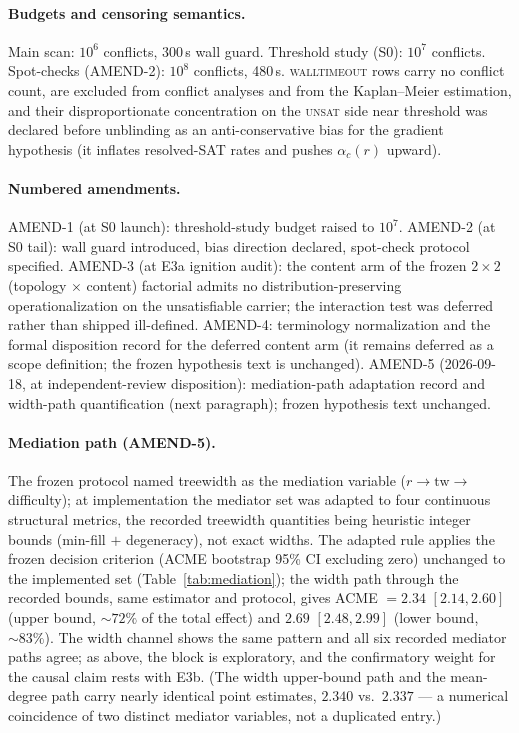 \documentclass[manuscript, screen, review]{jair}
\newcommand{\ac}[1]{\ensuremath{\alpha_c(#1)}}
\begin{document}
\paragraph{Budgets and censoring semantics.}
Main scan: $10^6$ conflicts, 300\,s wall guard. Threshold study (S0):
$10^7$ conflicts. Spot-checks (AMEND-2): $10^8$ conflicts, 480\,s.
\textsc{walltimeout} rows carry no conflict count, are excluded from
conflict analyses and from the Kaplan--Meier estimation, and their
disproportionate concentration on the \textsc{unsat} side near threshold was
declared before unblinding as an anti-conservative bias for the gradient
hypothesis (it inflates resolved-SAT rates and pushes $\ac{r}$ upward).

\paragraph{Numbered amendments.}
AMEND-1 (at S0 launch): threshold-study budget raised to $10^7$.
AMEND-2 (at S0 tail): wall guard introduced, bias direction declared,
spot-check protocol specified. AMEND-3 (at E3a ignition audit): the content
arm of the frozen $2\times2$ (topology $\times$ content) factorial admits no
distribution-preserving operationalization on the unsatisfiable carrier; the
interaction test was deferred rather than shipped ill-defined. AMEND-4:
terminology normalization and the formal disposition record for the deferred
content arm (it remains deferred as a scope definition; the frozen hypothesis
text is unchanged). AMEND-5 (2026-09-18, at independent-review disposition):
mediation-path adaptation record and width-path quantification (next
paragraph); frozen hypothesis text unchanged.

\paragraph{Mediation path (AMEND-5).}
The frozen protocol named treewidth as the mediation variable
($r \to \mathrm{tw} \to$ difficulty); at implementation the mediator set was
adapted to four continuous structural metrics, the recorded treewidth
quantities being heuristic integer bounds (min-fill $+$ degeneracy), not
exact widths. The adapted rule applies the frozen decision criterion (ACME
bootstrap 95\% CI excluding zero) unchanged to the implemented set
(Table~\ref{tab:mediation}); the width path through the recorded bounds,
same estimator and protocol, gives ACME $= 2.34$ $[2.14, 2.60]$ (upper
bound, ${\sim}72\%$ of the total effect) and $2.69$ $[2.48, 2.99]$ (lower
bound, ${\sim}83\%$). The width channel shows the same pattern and all six
recorded mediator paths agree; as above, the block is exploratory, and the
confirmatory weight for the causal claim rests with E3b. (The width
upper-bound path and the mean-degree path carry nearly identical point
estimates, $2.340$ vs.\ $2.337$ --- a numerical coincidence of two distinct
mediator variables, not a duplicated entry.)
\end{document}
